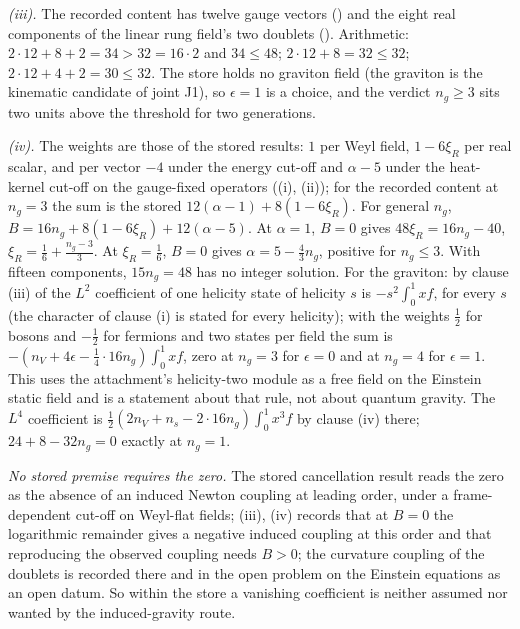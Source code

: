 \emph{(iii).} The recorded content has twelve gauge vectors () and the eight real components of the linear rung field's two doublets (). Arithmetic: $2 \cdot 12 + 8 + 2 = 34 > 32 = 16 \cdot 2$ and $34 \le 48$; $2 \cdot 12 + 8 = 32 \le 32$; $2 \cdot 12 + 4 + 2 = 30 \le 32$. The store holds no graviton field (the graviton is the kinematic candidate of joint J1), so $\epsilon = 1$ is a choice, and the verdict $n_{g} \ge 3$ sits two units above the threshold for two generations.

\emph{(iv).} The weights are those of the stored results: $1$ per Weyl field, $1 - 6\xi_{R}$ per real scalar, and per vector $-4$ under the energy cut-off and $\alpha - 5$ under the heat-kernel cut-off on the gauge-fixed operators ((i), (ii)); for the recorded content at $n_{g} = 3$ the sum is the stored $12(\alpha - 1) + 8(1 - 6\xi_{R})$. For general $n_{g}$, $B = 16n_{g} + 8(1 - 6\xi_{R}) + 12(\alpha - 5)$. At $\alpha = 1$, $B = 0$ gives $48\xi_{R} = 16n_{g} - 40$, $\xi_{R} = \tfrac16 + \tfrac{n_{g} - 3}{3}$. At $\xi_{R} = \tfrac16$, $B = 0$ gives $\alpha = 5 - \tfrac43 n_{g}$, positive for $n_{g} \le 3$. With fifteen components, $15n_{g} = 48$ has no integer solution. For the graviton: by clause (iii) of  the $L^{2}$ coefficient of one helicity state of helicity $s$ is $-s^{2}\int_{0}^{1}xf$, for every $s$ (the character of clause (i) is stated for every helicity); with the weights $\tfrac12$ for bosons and $-\tfrac12$ for fermions and two states per field the sum is $-(n_{V} + 4\epsilon - \tfrac14 \cdot 16n_{g})\int_{0}^{1}xf$, zero at $n_{g} = 3$ for $\epsilon = 0$ and at $n_{g} = 4$ for $\epsilon = 1$. This uses the attachment's helicity-two module as a free field on the Einstein static field and is a statement about that rule, not about quantum gravity. The $L^{4}$ coefficient is $\tfrac12(2n_{V} + n_{s} - 2 \cdot 16n_{g})\int_{0}^{1}x^{3}f$ by clause (iv) there; $24 + 8 - 32n_{g} = 0$ exactly at $n_{g} = 1$.

\emph{No stored premise requires the zero.} The stored cancellation result reads the zero as the absence of an induced Newton coupling at leading order, under a frame-dependent cut-off on Weyl-flat fields; (iii), (iv) records that at $B = 0$ the logarithmic remainder gives a negative induced coupling at this order and that reproducing the observed coupling needs $B > 0$; the curvature coupling of the doublets is recorded there and in the open problem on the Einstein equations as an open datum. So within the store a vanishing coefficient is neither assumed nor wanted by the induced-gravity route.

